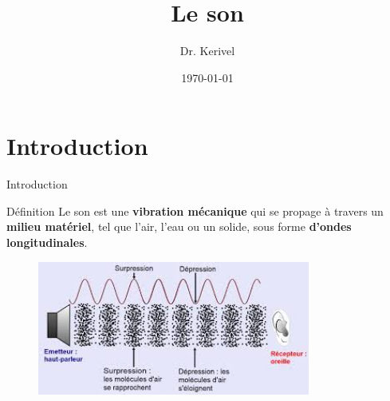\documentclass{beamer}
\title{Le son}
\author{Dr. Kerivel}
\date{\today}
\begin{document}
\begin{frame}
	\titlepage %
\end{frame}


\section{Introduction}

\begin{frame}{Introduction}
	\begin{block}{Définition}
		Le son est une \textbf{vibration mécanique} qui se propage à travers un \textbf{milieu matériel}, tel que l'air, l'eau ou un solide, sous forme \textbf{d'ondes longitudinales}.
	\end{block}
	\begin{figure}
		\center
		\includegraphics[width=0.8\textwidth]{leson.png}
	\end{figure}
\end{frame}
\end{document}
